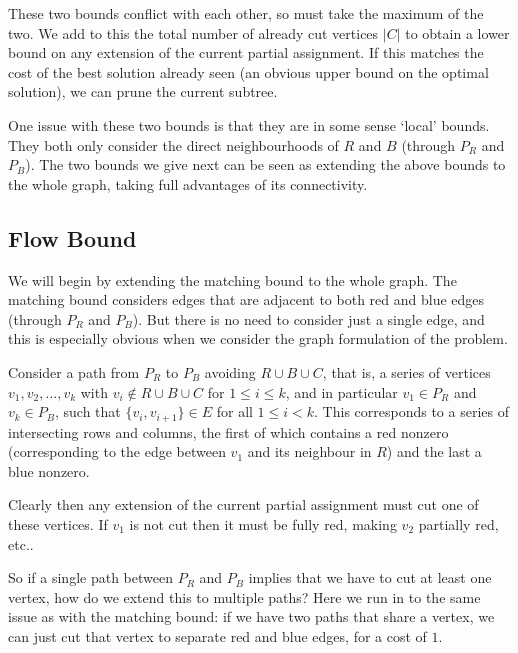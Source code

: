 	These two bounds conflict with each other, so must take the maximum of the
	two. We add to this the total number of already cut vertices $|C|$ to
	obtain a lower bound on any extension of the current partial assignment.
	If this matches the cost of the best solution already seen (an obvious
	upper bound on the optimal solution), we can prune the current subtree.

	One issue with these two bounds is that they are in some sense `local'
	bounds. They both only consider the direct neighbourhoods of $R$ and $B$
	(through $P_R$ and $P_B$). The two bounds we give next can be seen as
	extending the above bounds to the whole graph, taking full advantages of
	its connectivity.

	\subsection{Flow Bound}

	We will begin by extending the matching bound to the whole graph. The
	matching bound considers edges that are adjacent to both red and blue
	edges (through $P_R$ and $P_B$). But there is no need to consider just
	a single edge, and this is especially obvious when we consider the graph
	formulation of the problem.

	Consider a path from $P_R$ to $P_B$ avoiding $R \cup B \cup C$, that is,
	a series of vertices $v_1, v_2, \dots, v_k$ with
	$v_i \not\in R\cup B\cup C$ for $1 \leq i\leq k$,
	and in particular $v_1 \in P_R$ and $v_k \in P_B$,
	such that $\{v_i, v_{i+1}\} \in E$ for all $1 \leq i < k$. This
	corresponds to a series of intersecting rows and columns, the first of
	which contains a red nonzero (corresponding to the edge between $v_1$ and
	its neighbour in $R$) and the last a blue nonzero.

	Clearly then any extension of the current partial assignment must cut one
	of these vertices. If $v_1$ is not cut then it must be fully red, making
	$v_2$ partially red, etc..


	So if a single path between $P_R$ and $P_B$ implies that we have to cut at
	least one vertex, how do we extend this to multiple paths? Here we run in
	to the same issue as with the matching bound: if we have two paths that
	share a vertex, we can just cut that vertex to separate red and blue edges,
	for a cost of $1$.


